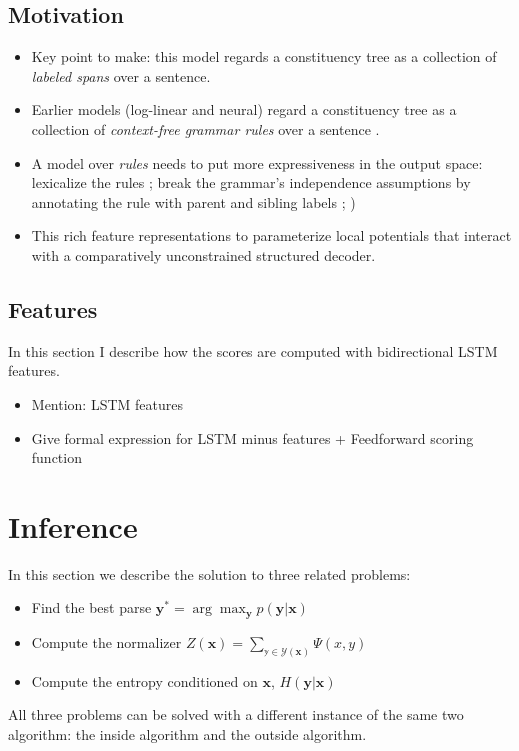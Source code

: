 \subsection{Motivation}
\begin{itemize}
  \item Key point to make: this model regards a constituency tree as a collection of \textit{labeled spans} over a sentence.
  \item Earlier models (log-linear and neural) regard a constituency tree as a collection of \textit{context-free grammar rules} over a sentence \citep{Klein+2003}.
  \item A model over \textit{rules} needs to put more expressiveness in the output space: lexicalize the rules \cite{Collins2003}; break the grammar's independence assumptions by annotating the rule with parent and sibling labels \citep{Klein+2003}; )
  \item This  rich feature representations to parameterize local potentials that interact with a comparatively unconstrained structured decoder.
\end{itemize}

\subsection{Features}
In this section I describe how the scores are computed with bidirectional LSTM features.
\begin{itemize}
  \item Mention: LSTM features
  \item Give formal expression for LSTM minus features + Feedforward scoring function
\end{itemize}

\section{Inference}
In this section we describe the solution to three related problems:
\begin{itemize}
  \item Find the best parse $\mathbf{y}^{*} = \arg \max_{\mathbf{y}} p(\mathbf{y} | \mathbf{x})$
  \item Compute the normalizer $Z(\mathbf{x}) = \sum_{\mathbb{y}\in \mathcal{Y}(\mathbf{x})} \Psi(x, y)$
  \item Compute the entropy conditioned on $\mathbf{x}$, $H(\mathbf{y} | \mathbf{x})$
\end{itemize}
All three problems can be solved with a different instance of the same two algorithm: the inside algorithm and the outside algorithm.



